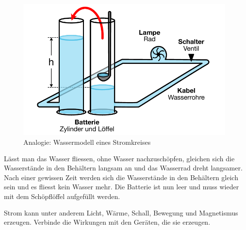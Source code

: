 \begin{figure}[h!]
    \centering
    \includegraphics[width=11cm]{_images/wassermodell_stromkreis.pdf}
    \caption{Analogie: Wassermodell eines Stromkreises}
    \label{fig:watermodel}
\end{figure}

Lässt man das Wasser fliessen, ohne Wasser nachzuschöpfen, gleichen sich
die Wasserstände in den Behältern langsam an und das Wasserrad dreht langsamer.
Nach einer gewissen Zeit werden sich die Wasserstände in den Behältern gleich
sein und es fliesst kein Wasser mehr. Die Batterie ist nun leer und muss wieder
mit dem Schöpflöffel aufgefüllt werden.






\newpage
{}

Strom kann unter anderem Licht, Wärme, Schall, Bewegung und Magnetismus erzeugen.
Verbinde die Wirkungen mit den Geräten, die sie erzeugen.

